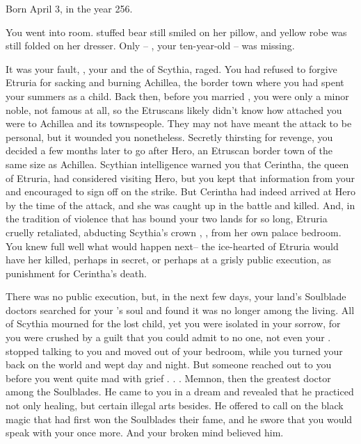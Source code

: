 \documentclass[char]{Kos}
\begin{document}
\name{\cScythiaQueen{}}


Born April 3, in the year 256.

You went into \cFugitive{\their} room. \cFugitive{\Their} stuffed bear still smiled on her pillow, and \cFugitive{\their} yellow robe was still folded on her dresser. Only \cFugitive{\they}-- \cFugitive{}, your ten-year-old  \cFugitive{\offspring}-- was missing.

It was your fault, \cScythiaKing{}, your \cScythiaKing{\spouse} and the \cScythiaKing{\monarch} of Scythia, raged. You had refused to forgive Etruria for sacking and burning Achillea, the border town where you had spent your summers as a child. Back then, before you married \cScythiaKing{}, you were only a minor noble, not famous at all, so the Etruscans likely didn't know how attached you were to Achillea and its townspeople. They may not have meant the attack to be personal, but it wounded you nonetheless. Secretly thirsting for revenge, you decided a few months later to go after Hero, an Etruscan border town of the same size as Achillea. Scythian intelligence warned you that Cerintha, the queen of Etruria, had considered visiting Hero, but you kept that information from your \cScythiaKing{\spouse} and encouraged \cScythiaKing{\them} to sign off on the strike. But Cerintha had indeed arrived at Hero by the time of the attack, and she was caught up in the battle and killed. And, in the tradition of violence that has bound your two lands for so long, Etruria cruelly retaliated, abducting Scythia's crown \cFugitive{\prince}, \cFugitive{}, from her own palace bedroom. You knew full well what would happen next-- the ice-hearted \cEtruriaKing{\Monarch} of Etruria would have her killed, perhaps in secret, or perhaps at a grisly public execution, as punishment for Cerintha's death.

There was no public execution, but, in the next few days, your land's Soulblade doctors searched for your \cFugitive{\offspring}'s soul and found it was no longer among the living. All of Scythia mourned for the lost child, yet you were isolated in your sorrow, for you were crushed by a guilt that you could admit to no one, not even your \cScythiaKing{\spouse}.  stopped talking to you and moved out of your bedroom, while you turned your back on the world and wept day and night. But someone reached out to you before you went quite mad with grief . . . Memnon, then the greatest doctor among the Soulblades. He came to you in a dream and revealed that he practiced not only healing, but certain illegal arts besides. He offered to call on the black magic that had first won the Soulblades their fame, and he swore that you would speak with your \cFugitive{\offspring} once more. And your broken mind believed him.
\end{document}
